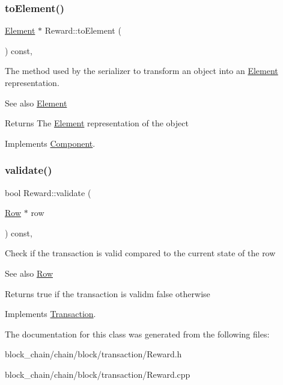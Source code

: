 \subsubsection{\texorpdfstring{to\+Element()}{toElement()}}
{\footnotesize\ttfamily \mbox{\hyperlink{classElement}{Element}} $\ast$ Reward\+::to\+Element (\begin{DoxyParamCaption}{ }\end{DoxyParamCaption}) const\hspace{0.3cm}{\ttfamily [final]}, {\ttfamily [virtual]}}

The method used by the serializer to transform an object into an \mbox{\hyperlink{classElement}{Element}} representation. \begin{DoxySeeAlso}{See also}
\mbox{\hyperlink{classElement}{Element}}
\end{DoxySeeAlso}
\begin{DoxyReturn}{Returns}
The \mbox{\hyperlink{classElement}{Element}} representation of the object 
\end{DoxyReturn}


Implements \mbox{\hyperlink{classComponent_a3e63d8c993e417a4af3f56d65ebfc7ea}{Component}}.

\mbox{\label{classReward_a9c9a3219ba6b8b068f7f1cccc779b1b5}} 
\subsubsection{\texorpdfstring{validate()}{validate()}}
{\footnotesize\ttfamily bool Reward\+::validate (\begin{DoxyParamCaption}\item[{\mbox{\hyperlink{classRow}{Row}} $\ast$}]{row }\end{DoxyParamCaption}) const\hspace{0.3cm}{\ttfamily [final]}, {\ttfamily [virtual]}}

Check if the transaction is valid compared to the current state of the row \begin{DoxySeeAlso}{See also}
\mbox{\hyperlink{classRow}{Row}}
\end{DoxySeeAlso}
\begin{DoxyReturn}{Returns}
true if the transaction is validm false otherwise 
\end{DoxyReturn}


Implements \mbox{\hyperlink{classTransaction_a638518143f0defde1c3c73e33db1b7f1}{Transaction}}.



The documentation for this class was generated from the following files\+:\begin{DoxyCompactItemize}
\item 
block\+\_\+chain/chain/block/transaction/Reward.\+h\item 
block\+\_\+chain/chain/block/transaction/Reward.\+cpp\end{DoxyCompactItemize}

